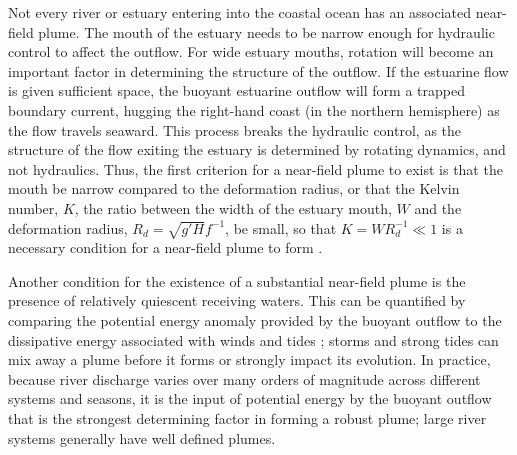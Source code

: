 \documentclass[12pt]{article}
\begin{document}
{%


Not every river or estuary entering into the coastal ocean has an associated near-field plume. The mouth of the estuary needs to be narrow enough for hydraulic control to affect the outflow. For wide estuary mouths, rotation will become an important factor in determining the structure of the outflow. If the estuarine flow is given sufficient space, the buoyant estuarine outflow will form a trapped boundary current, hugging the right-hand coast (in the northern hemisphere) as the flow travels seaward. This process breaks the hydraulic control, as the structure of the flow exiting the estuary is determined by rotating dynamics, and not hydraulics. Thus, the first criterion for a near-field plume to exist is that the mouth be narrow compared to the deformation radius, or that the Kelvin number, $K$, the ratio between the width of the estuary mouth, $W$ and the deformation radius, $R_d = \sqrt{g' H} f^{-1}$, be small, so that $K = W R_d^{-1} \ll 1$ is a necessary condition for a near-field plume to form \citep{horner-devine.ea:15}.

Another condition for the existence of a substantial near-field plume is the presence of relatively quiescent receiving waters. This can be quantified by comparing the potential energy anomaly provided by the buoyant outflow to the dissipative energy associated with winds and tides \citep{pritchard.huntley:02}; storms and strong tides can mix away a plume before it forms or strongly impact its evolution. In practice, because river discharge varies over many orders of magnitude across different systems and seasons, it is the input of potential energy by the buoyant outflow that is the strongest determining factor in forming a robust plume; large river systems generally have well defined plumes.

}
\end{document}

